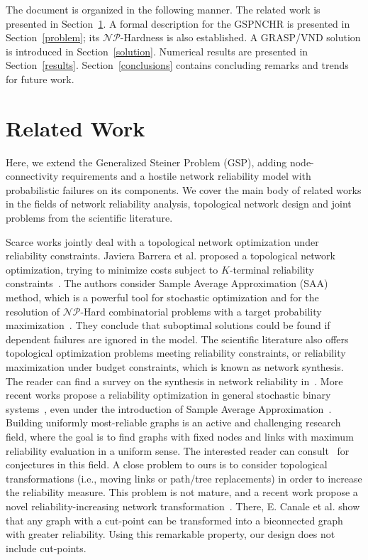 \documentclass{llncs}
\begin{document}
The document is organized in the following manner. The related work is presented in Section~\ref{work}. 
A formal description for the GSPNCHR is presented in Section~\ref{problem}; its $\mathcal{NP}$-Hardness is also established. 
A GRASP/VND solution is introduced in Section~\ref{solution}. 
Numerical results are presented in Section~\ref{results}. 
Section~\ref{conclusions} contains concluding remarks and trends for future work. 


\section{Related Work} \label{work}
Here, we extend the Generalized Steiner Problem (GSP), adding node-connectivity requirements and a hostile network reliability model with probabilistic failures on its components. We cover the main body of related works in the 
fields of network reliability analysis, topological network design and joint problems from the scientific literature. 

Scarce works jointly deal with a topological network optimization under reliability constraints. Javiera Barrera et al. proposed a topological network optimization, trying to minimize costs subject to $K$-terminal reliability constraints~\cite{106}. The authors consider Sample Average Approximation (SAA) method, which is a powerful tool for  stochastic optimization and for the resolution of $\mathcal{NP}$-Hard combinatorial problems with a target probability maximization~\cite{112}. They conclude that suboptimal solutions could be found if dependent failures are ignored in the model. The scientific literature also offers topological optimization problems meeting reliability constraints, or reliability maximization under budget constraints, which is known as network synthesis. 
The reader can find a survey on the synthesis in network reliability in~\cite{113}. 
More recent works propose a reliability optimization in general stochastic binary systems~\cite{107}, even under the introduction of Sample Average Approximation~\cite{114}. Building uniformly most-reliable graphs is an active and challenging research field, where the goal is to find graphs with fixed nodes and links with maximum reliability evaluation in a uniform sense. 
The interested reader can consult~\cite{115} for conjectures in this field. A close problem to ours is to consider topological transformations (i.e., moving links or path/tree replacements) in order to increase the reliability measure. This problem is not mature, and a recent work propose a novel reliability-increasing network transformation~\cite{110}. There, E. Canale et al. show that any graph with a cut-point can be transformed into a biconnected graph with greater reliability. Using this remarkable property, our design does not include cut-points. 
\end{document}
